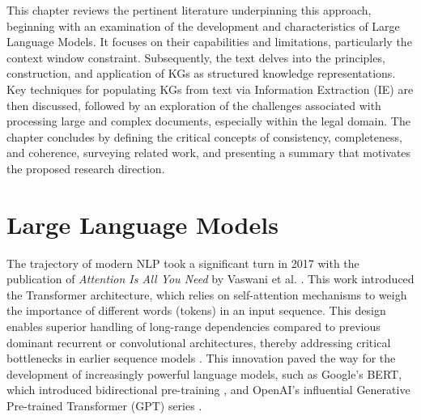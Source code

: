 This chapter reviews the pertinent literature underpinning this approach, beginning with an examination of the development and characteristics of Large Language Models. It focuses on their capabilities and limitations, particularly the context window constraint. Subsequently, the text delves into the principles, construction, and application of KGs as structured knowledge representations. Key techniques for populating KGs from text via Information Extraction (IE) are then discussed, followed by an exploration of the challenges associated with processing large and complex documents, especially within the legal domain. The chapter concludes by defining the critical concepts of consistency, completeness, and coherence, surveying related work, and presenting a summary that motivates the proposed research direction.

\section{Large Language Models}
The trajectory of modern NLP took a significant turn in 2017 with the publication of \textit{Attention Is All You Need} by Vaswani et al. \parencite{RefWorks:RefID:81-vaswani2017attention}. This work introduced the Transformer architecture, which relies on self-attention mechanisms to weigh the importance of different words (tokens) in an input sequence. This design enables superior handling of long-range dependencies compared to previous dominant recurrent or convolutional architectures, thereby addressing critical bottlenecks in earlier sequence models \parencite{RefWorks:RefID:90-turner2024introduction,RefWorks:RefID:101-zhao2023survey}. This innovation paved the way for the development of increasingly powerful language models, such as Google's BERT, which introduced bidirectional pre-training \parencite{RefWorks:RefID:167-gardazi2025bert}, and OpenAI's influential Generative Pre-trained Transformer (GPT) series \parencite{RefWorks:RefID:92-gao2023examining}.

